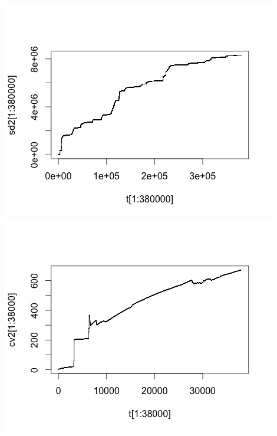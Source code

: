\documentclass[11pt]{article}
\begin{document}
\includegraphics[scale=0.5]{SD2.png}
\includegraphics[scale=0.5]{CV2.png} 
\end{document}
